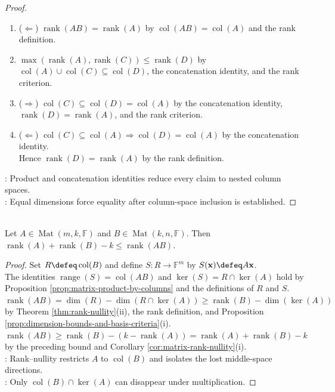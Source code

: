 \begin{theorem}
\begin{proof}
\begin{enumerate}[label=(\roman*)]
\item[$(ii)$] ($\Leftarrow$) $\operatorname{rank}(AB)=\operatorname{rank}(A)$ by $\operatorname{col}(AB)=\operatorname{col}(A)$ and the rank definition.
\item[$(iii)$] $\max(\operatorname{rank}(A),\operatorname{rank}(C))\leq\operatorname{rank}(D)$ by $\operatorname{col}(A)\cup\operatorname{col}(C)\subseteq\operatorname{col}(D)$, the concatenation identity, and the rank criterion.
\item[$(iv)$] ($\Rightarrow$) $\operatorname{col}(C)\subseteq\operatorname{col}(D)=\operatorname{col}(A)$ by the concatenation identity, $\operatorname{rank}(D)=\operatorname{rank}(A)$, and the rank criterion.
\item[$(iv)$] ($\Leftarrow$) $\operatorname{col}(C)\subseteq\operatorname{col}(A)\Rightarrow\operatorname{col}(D)=\operatorname{col}(A)$ by the concatenation identity.\\
Hence $\operatorname{rank}(D)=\operatorname{rank}(A)$ by the rank definition.
\end{enumerate}
: Product and concatenation identities reduce every claim to nested column spaces.\\
: Equal dimensions force equality after column-space inclusion is established.
\end{proof}
\end{theorem}

\begin{theorem} \label{thm:sylvester-rank-inequality} \\
Let $A\in\operatorname{Mat}(m,k,\mathbb{F})$ and $B\in\operatorname{Mat}(k,n,\mathbb{F})$. Then $\operatorname{rank}(A)+\operatorname{rank}(B)-k\leq\operatorname{rank}(AB)$.
\begin{proof}
Set $R\defeq\operatorname{col}(B)$ and define $S:R\to\mathbb{F}^m$ by $S(\mathbf{x})\defeq A\mathbf{x}$.\\
The identities $\operatorname{range}(S)=\operatorname{col}(AB)$ and $\ker(S)=R\cap\ker(A)$ hold by Proposition \ref{prop:matrix-product-by-columns} and the definitions of $R$ and $S$.\\
$\operatorname{rank}(AB)=\dim(R)-\dim(R\cap\ker(A))\geq\operatorname{rank}(B)-\dim(\ker(A))$ by Theorem \ref{thm:rank-nullity}(ii), the rank definition, and Proposition \ref{prop:dimension-bounds-and-basis-criteria}(i).\\
$\operatorname{rank}(AB)\geq\operatorname{rank}(B)-(k-\operatorname{rank}(A))=\operatorname{rank}(A)+\operatorname{rank}(B)-k$ by the preceding bound and Corollary \ref{cor:matrix-rank-nullity}(i).\\
: Rank--nullity restricts $A$ to $\operatorname{col}(B)$ and isolates the lost middle-space directions.\\
: Only $\operatorname{col}(B)\cap\ker(A)$ can disappear under multiplication.
\end{proof}
\end{theorem}

